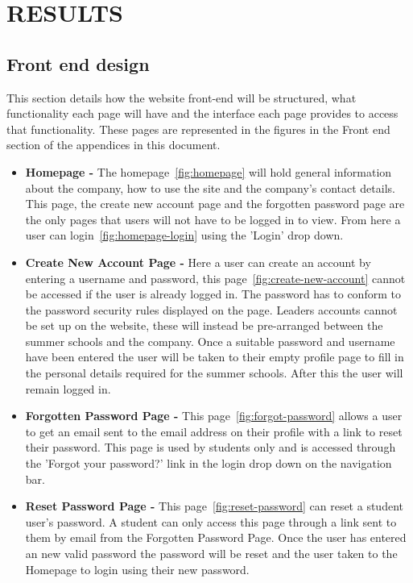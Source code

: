 \documentclass{project}
\begin{document}
\section{RESULTS}
\subsection{Front end design}
This section details how the website front-end will be structured, what functionality each page will have and the interface each page provides to access that functionality.
These pages are represented in the figures in the Front end section of the appendices in this document. 
\begin{itemize}
\item \textbf{Homepage -}
The homepage~\ref{fig:homepage} will hold general information about the company, how to use the site and the company's contact details. This page, the create new account page and the forgotten password page are the only pages that users will not have to be logged in to view. From here a user can login~\ref{fig:homepage-login} using the 'Login' drop down.

\item \textbf{Create New Account Page -}
Here a user can create an account by entering a username and password, this page~\ref{fig:create-new-account} cannot be accessed if the user is already logged in. The password has to conform to the password security rules displayed on the page. Leaders accounts cannot be set up on the website, these will instead be pre-arranged between the summer schools and the company. Once a suitable password and username have been entered the user will be taken to their empty profile page to fill in the personal details required for the summer schools. After this the user will remain logged in.  

\item \textbf{Forgotten Password Page -}
This page~\ref{fig:forgot-password} allows a user to get an email sent to the email address on their profile with a link to reset their password. This page is used by students only and is accessed through the 'Forgot your password?' link in the login drop down on the navigation bar. 

\item \textbf{Reset Password Page -}
This page~\ref{fig:reset-password} can reset a student user's password. A student can only access this page through a link sent to them by email from the Forgotten Password Page. Once the user has entered an new valid password the password will be reset and the user taken to the Homepage to login using their new password.


\end{itemize}
\end{document}
